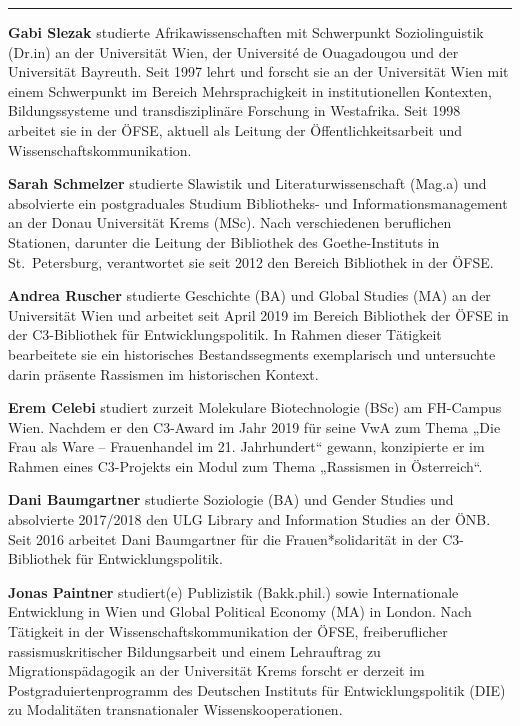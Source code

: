 \begin{center}\rule{0.5\linewidth}{0.5pt}\end{center}

\textbf{Gabi Slezak} studierte Afrikawissenschaften mit Schwerpunkt
Soziolinguistik (Dr.in) an der Universität Wien, der Université de
Ouagadougou und der Universität Bayreuth. Seit 1997 lehrt und forscht
sie an der Universität Wien mit einem Schwerpunkt im Bereich
Mehrsprachigkeit in institutionellen Kontexten, Bildungssysteme und
transdisziplinäre Forschung in Westafrika. Seit 1998 arbeitet sie in der
ÖFSE, aktuell als Leitung der Öffentlichkeitsarbeit und
Wissenschaftskommunikation.

\textbf{Sarah Schmelzer} studierte Slawistik und Literaturwissenschaft
(Mag.a) und absolvierte ein postgraduales Studium Bibliotheks- und
Informationsmanagement an der Donau Universität Krems (MSc). Nach
verschiedenen beruflichen Stationen, darunter die Leitung der Bibliothek
des Goethe-Instituts in St.~Petersburg, verantwortet sie seit 2012 den
Bereich Bibliothek in der ÖFSE.

\textbf{Andrea Ruscher} studierte Geschichte (BA) und Global Studies
(MA) an der Universität Wien und arbeitet seit April 2019 im Bereich
Bibliothek der ÖFSE in der C3-Bibliothek für Entwicklungspolitik. In
Rahmen dieser Tätigkeit bearbeitete sie ein historisches
Bestandssegments exemplarisch und untersuchte darin präsente Rassismen
im historischen Kontext.

\textbf{Erem Celebi} studiert zurzeit Molekulare Biotechnologie (BSc) am
FH-Campus Wien. Nachdem er den C3-Award im Jahr 2019 für seine VwA zum
Thema „Die Frau als Ware -- Frauenhandel im 21. Jahrhundert`` gewann,
konzipierte er im Rahmen eines C3-Projekts ein Modul zum Thema
„Rassismen in Österreich``.

\textbf{Dani Baumgartner} studierte Soziologie (BA) und Gender Studies
und absolvierte 2017/2018 den ULG Library and Information Studies an der
ÖNB. Seit 2016 arbeitet Dani Baumgartner für die Frauen*solidarität in
der C3-Bibliothek für Entwicklungspolitik.

\textbf{Jonas Paintner} studiert(e) Publizistik (Bakk.phil.) sowie
Internationale Entwicklung in Wien und Global Political Economy (MA) in
London. Nach Tätigkeit in der Wissenschaftskommunikation der ÖFSE,
freiberuflicher rassismuskritischer Bildungsarbeit und einem Lehrauftrag
zu Migrationspädagogik an der Universität Krems forscht er derzeit im
Postgraduiertenprogramm des Deutschen Instituts für Entwicklungspolitik
(DIE) zu Modalitäten transnationaler Wissenskooperationen.
